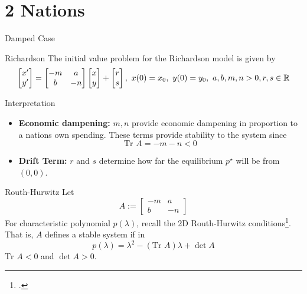 \documentclass{beamer}
\begin{document}
\section{2 Nations}
\begin{frame}[allowframebreaks]{Damped Case}\label{section2}
\begin{block}{Richardson}
The initial value problem for the Richardson model is given by
\begin{equation}\label{eq:richardson}
  \begin{bmatrix}
    x^{\prime}\\
    y^{\prime}
  \end{bmatrix} = 
  \begin{bmatrix}
    -m & a \\
    b & -n 
    \end{bmatrix}
    \begin{bmatrix}
      x \\ 
      y
      \end{bmatrix}+\begin{bmatrix}r \\ s\end{bmatrix},~x(0)=x_0,~y(0)=y_0,~a,b,m,n>0,r,s\in\mathbb{R}
\end{equation}
\end{block}
\begin{block}{Interpretation}
  \begin{itemize}
    \item \textbf{Economic dampening:} $m,n$ provide economic dampening in proportion to a nations own spending. These terms provide stability to the system since 
      \begin{equation}\label{eq:tr}\text{Tr }A = -m-n <0\end{equation}
    \item \textbf{Drift Term:} $r$ and $s$ determine how far the equilibrium $p^\star$ will be from $(0,0)$.
  \end{itemize}
\end{block}
\begin{block}{Routh-Hurwitz}
  Let \[A:=
  \begin{bmatrix}
    -m & a \\
    b & -n 
  \end{bmatrix}\]
  For characteristic polynomial $p(\lambda)$, recall the 2D Routh-Hurwitz conditions\footcite[Chap. 3]{MoghadasJaberiDouraki2019}. That is, $A$ defines a stable system if in
  \[
    p(\lambda)=\lambda^2-(\text{Tr }A)\lambda+\det{A}
  \]
  $\text{Tr }A < 0$ and $\det{A}>0$.

\end{block}
\end{frame}
\end{document}
